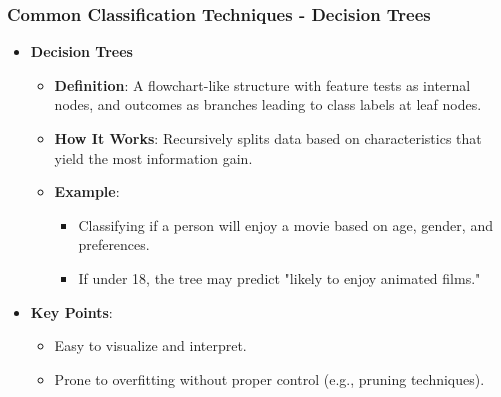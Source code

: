 \documentclass[aspectratio=169]{beamer}
\begin{document}
\begin{frame}[fragile]
    \frametitle{Common Classification Techniques - Decision Trees}
    \begin{itemize}
        \item \textbf{Decision Trees}
        \begin{itemize}
            \item \textbf{Definition}: A flowchart-like structure with feature tests as internal nodes, and outcomes as branches leading to class labels at leaf nodes.
            \item \textbf{How It Works}: Recursively splits data based on characteristics that yield the most information gain.
            \item \textbf{Example}: 
            \begin{itemize}
                \item Classifying if a person will enjoy a movie based on age, gender, and preferences. 
                \item If under 18, the tree may predict "likely to enjoy animated films."
            \end{itemize}
        \end{itemize}
        
        \item \textbf{Key Points}:
        \begin{itemize}
            \item Easy to visualize and interpret.
            \item Prone to overfitting without proper control (e.g., pruning techniques).
        \end{itemize}
    \end{itemize}
\end{frame}
\end{document}
